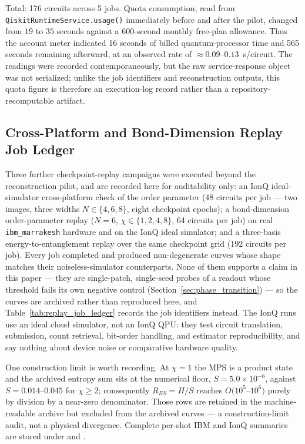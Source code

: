 \documentclass[11pt]{article}
\begin{document}
Total: 176 circuits across 5 jobs. Quota consumption, read from \texttt{QiskitRuntimeService.}\allowbreak\texttt{usage()} immediately before and after the pilot, changed from $19$ to $35$ seconds against a $600$-second monthly free-plan allowance. Thus the account meter indicated 16 seconds of billed quantum-processor time and 565 seconds remaining afterward, at an observed rate of $\approx\!0.09$--$0.13$~s/circuit. The readings were recorded contemporaneously, but the raw service-response object was not serialized; unlike the job identifiers and reconstruction outputs, this quota figure is therefore an execution-log record rather than a repository-recomputable artifact.

\subsection{Cross-Platform and Bond-Dimension Replay Job Ledger}
\label{sec:supp_bond_dimension_hardware}
Three further checkpoint-replay campaigns were executed beyond the reconstruction pilot, and are recorded here for auditability only: an IonQ ideal-simulator cross-platform check of the order parameter (48 circuits per job --- two images, three widths $N\in\{4,6,8\}$, eight checkpoint epochs); a bond-dimension order-parameter replay ($N=6$, $\chi\in\{1,2,4,8\}$, 64 circuits per job) on real \texttt{ibm\_marrakesh} hardware and on the IonQ ideal simulator; and a three-basis energy-to-entanglement replay over the same checkpoint grid (192 circuits per job). Every job completed and produced non-degenerate curves whose shape matches their noiseless-simulator counterparts. None of them supports a claim in this paper --- they are single-patch, single-seed probes of a readout whose threshold fails its own negative control (Section~\ref{sec:phase_transition}) --- so the curves are archived rather than reproduced here, and Table~\ref{tab:replay_job_ledger} records the job identifiers instead. The IonQ runs use an ideal cloud simulator, not an IonQ QPU: they test circuit translation, submission, count retrieval, bit-order handling, and estimator reproducibility, and say nothing about device noise or comparative hardware quality.

One construction limit is worth recording. At $\chi=1$ the MPS is a product state and the archived entropy sum sits at the numerical floor, $S=5.0\times10^{-6}$, against $S=0.014$--$0.045$ for $\chi\geq2$; consequently $R_{ES}=H/S$ reaches $O(10^5$--$10^6)$ purely by division by a near-zero denominator. Those rows are retained in the machine-readable archive but excluded from the archived curves --- a construction-limit audit, not a physical divergence. Complete per-shot IBM and IonQ summaries are stored under  and .
\end{document}
